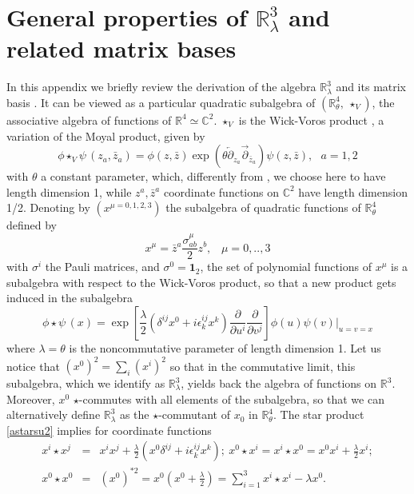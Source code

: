 \documentclass[a4paper,11pt]{article}
\numberwithin{equation}{section}
\newcommand\Rl{\mathbb{R}^3_\lambda}
\newcommand\del{{\partial}}
\theoremstyle{nonumberplain}
\begin{document}
\section{\texorpdfstring{General properties of $\mathbb{R}^3_\lambda$ and related matrix bases}{Diff calcul}}\label{appendix0}
In this appendix we briefly review the derivation of the algebra $\Rl$ and its matrix basis \cite{vit-wal-12}.
 It can be viewed as a particular quadratic subalgebra of $(\mathbb{R}^4_\theta,\ \star_V)$, the associative algebra of functions of $\mathbb{R}^4\simeq\mathbb{C}^2$.   $\star_V$ is the  Wick-Voros product \cite{Wick-Voros}, a variation of the Moyal product, given by
\begin{equation}
\phi\star_V \psi\, (z_a,\bar z_a)= \phi(z,\bar z) \exp(\theta \overleftarrow\del_{z_a}\overrightarrow\del_{\bar z_a}) \psi(z,\bar z), \,\,\,\, a=1,2 \label{Wick-Vorosprod}
\end{equation}
with  $\theta$ a constant parameter, which, differently from \cite{vit-wal-12}, we choose here to have length dimension 1, while $z^a, \bar z^a$  coordinate functions on $\mathbb{C}^2$ have length dimension 1/2. 
Denoting by $(x^{\mu=0,1,2,3})$ the subalgebra of quadratic functions  of $\mathbb{R}^4_\theta$ defined by
\begin{equation}
x^\mu=  \bar z^a \frac{\sigma^\mu_{ab}}{2} z^b, \;\;\; \mu=0, ..,3 \label{xmu}\end{equation}
with $\sigma^i$
  the Pauli matrices, and $\sigma^0= \mathbf{1}_2$, 
the set of polynomial functions of $x^\mu$  is a subalgebra  with respect to the Wick-Voros product, so that a new product gets  induced in the subalgebra
\begin{equation}
\phi\star \psi \,(x)= \exp\left[\frac{\lambda}{2}\left(\delta^{ij} x^0+ i \epsilon^{ij}_k x^k \right)\frac{\del}{\del u^i}\frac{\del}{\del v^j}\right] \phi(u) \psi(v)|_{u=v=x} \label{astarsu2}
\end{equation}
where $\lambda=\theta$ is the  noncommutative parameter of length dimension 1. Let us notice that $(x^0)^2= \sum_i (x^i)^2$  so that in the commutative limit,  this subalgebra, which we identify as $\Rl$,  yields back the algebra of functions on $\mathbb{R}^3$. Moreover, $x^0$ $\star$-commutes with all elements of the subalgebra, so that we can alternatively define 
 $\Rl$ as the $\star$-commutant of $x_0$ in $\mathbb{R}^4_\theta$. The star product \eqref{astarsu2} implies for coordinate functions
 \begin{eqnarray}
x^i\star x^j&=& x^i x^j+ \frac{\lambda}{2} \left(x^0 \delta^{ij} + i \epsilon^{ij}_k x^k\right);\ x^0\star x^i = x^i\star x^0 = x^0 x^i + \frac{\lambda}{2} x^i;\\
x^0\star x^0&=&(x^0)^{*2}=x^0(x^0+\frac{\lambda}{2}) = \sum_{i=1}^3 x^i\star x^i- \lambda x^0 . \label{ax0*2}
 \end{eqnarray}
\end{document}
